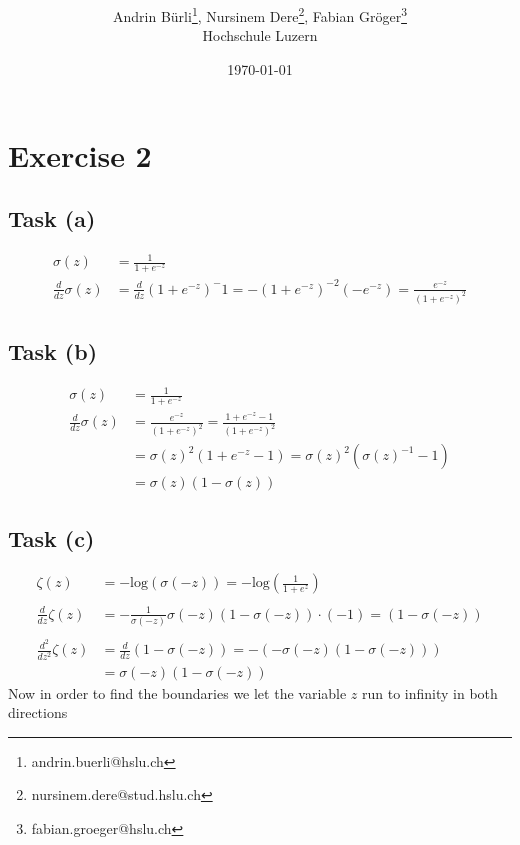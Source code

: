 \documentclass[onecolumn]{article}
\title{\spacecaps{Lab report: SW02 }\\ \normalsize \spacesc{TSM\_DeLearn} }
\author{Andrin Bürli\thanks{andrin.buerli@hslu.ch}, Nursinem Dere\thanks{nursinem.dere@stud.hslu.ch}, Fabian Gröger\thanks{fabian.groeger@hslu.ch}\\Hochschule Luzern}
\date{\today}
\begin{document}
\maketitle

\section{Exercise 2}

\subsection{Task (a)}

\[
\begin{aligned}
	\sigma(z)&=\frac{1}{1+e^{-z}}\\
	\frac{d}{dz} \sigma(z) &= \frac{d}{dz}(1+e^{-z})^-1=-(1+e^{-z})^{-2}(-e^{-z})=\frac{e^{-z}}{(1+e^{-z})^{2}}
\end{aligned}
\]

\subsection{Task (b)}

\[
\begin{aligned}
	\sigma(z)&=\frac{1}{1+e^{-z}} \\
	\frac{d}{dz} \sigma(z) &= \frac{e^{-z}}{(1+e^{-z})^{2}}=\frac{1+e^{-z}-1}{(1+e^{-z})^{2}} \\
	&=\sigma(z)^2(1+e^{-z}-1)=\sigma(z)^2(\sigma(z)^{-1}-1) \\
	&=\sigma(z)(1-\sigma(z))
\end{aligned}
\]

\subsection{Task (c)}

\[
\begin{aligned}
	\zeta(z)&=-\text{log}(\sigma(-z))=-\text{log}\left(\frac{1}{1+e^z}\right)\\
	\\
	\frac{d}{dz} \zeta(z) &= -\frac{1}{\sigma(-z)} \sigma(-z)(1-\sigma(-z))\cdot (-1) = (1-\sigma(-z)) \\
	\\
	\frac{d^2}{dz^2} \zeta(z) &=\frac{d}{dz} (1-\sigma(-z))=-(-\sigma(-z)(1-\sigma(-z)))\\
	&=\sigma(-z)(1-\sigma(-z))
\end{aligned}
\]
Now in order to find the boundaries we let the variable $z$ run to infinity in both directions
\end{document}
